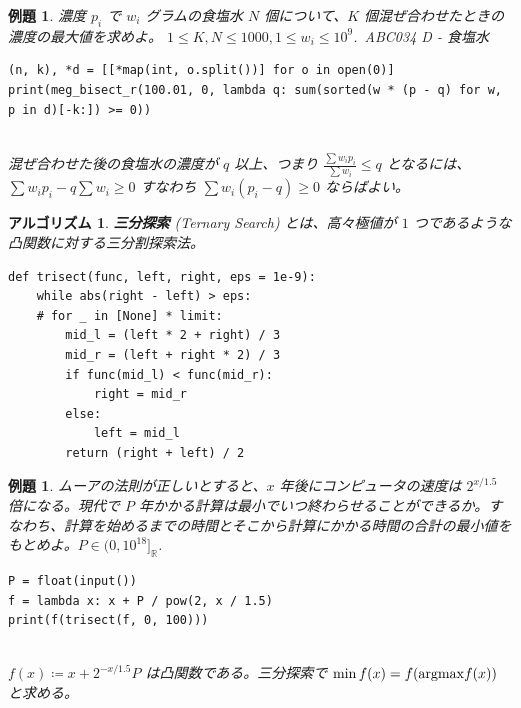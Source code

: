 \documentclass[12pt, a4j]{ltjsarticle}
\newtheorem{alg}[thm]{アルゴリズム}
\newtheorem{exm}[thm]{例題}
\begin{document}
\vspace{1cm}

\begin{exm}\upshape 濃度 $p_i$ で $w_i$ グラムの食塩水 $N$ 個について、$K$ 個混ぜ合わせたときの濃度の最大値を求めよ。 $1 \le K,N \le 1000, 1\le w_i \le 10^9$.\ ABC034 D - 食塩水\\
\begin{lstlisting}
(n, k), *d = [[*map(int, o.split())] for o in open(0)]
print(meg_bisect_r(100.01, 0, lambda q: sum(sorted(w * (p - q) for w, p in d)[-k:]) >= 0))
\end{lstlisting}\quad\\
混ぜ合わせた後の食塩水の濃度が $q$ 以上、つまり $\displaystyle\frac{\sum w_ip_i}{\sum w_i} \le q$ となるには、$\sum w_ip_i - q \sum w_i \ge 0$ すなわち $\sum w_i(p_i-q)\ge 0$ ならばよい。
\end{exm}

\vspace{1cm}

\begin{alg}{\bf 三分探索} (Ternary Search) とは、高々極値が $1$ つであるような凸関数に対する三分割探索法。\\\upshape
\begin{lstlisting}
def trisect(func, left, right, eps = 1e-9):
    while abs(right - left) > eps:
    # for _ in [None] * limit:
        mid_l = (left * 2 + right) / 3
        mid_r = (left + right * 2) / 3
        if func(mid_l) < func(mid_r):
            right = mid_r
        else:
            left = mid_l
        return (right + left) / 2
\end{lstlisting}
\end{alg}

\vspace{1cm}

\begin{exm} ムーアの法則が正しいとすると、$x$ 年後にコンピュータの速度は $2^{x/1.5}$ 倍になる。現代で $P$ 年かかる計算は最小でいつ終わらせることができるか。すなわち、計算を始めるまでの時間とそこから計算にかかる時間の合計の最小値をもとめよ。$P\in(0,10^{18}]_\mathbb{R}$.\\\upshape
\begin{lstlisting}
P = float(input())
f = lambda x: x + P / pow(2, x / 1.5)
print(f(trisect(f, 0, 100)))
\end{lstlisting}\quad\\
$f(x)\coloneqq x + 2^{-x/1.5}P$ は凸関数である。三分探索で $\min f(x) = f({\rm argmax} f(x))$ と求める。
\end{exm}
\end{document}
